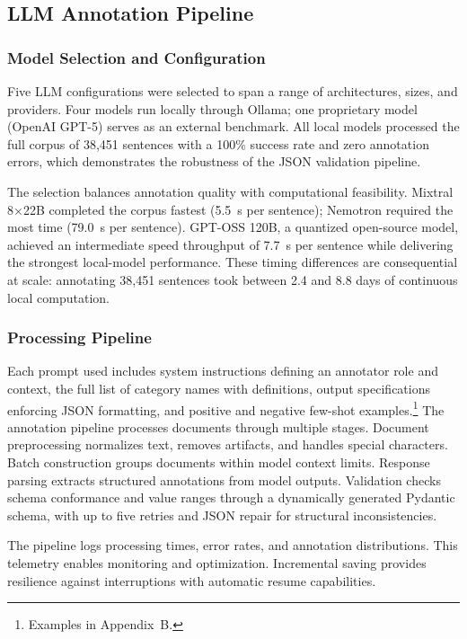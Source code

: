\documentclass[12pt]{article}
\begin{document}
\subsection{LLM Annotation Pipeline}

\subsubsection{Model Selection and Configuration}

Five LLM configurations were selected to span a range of architectures, sizes, and providers. Four models run locally through Ollama; one proprietary model (OpenAI GPT-5) serves as an external benchmark. All local models processed the full corpus of 38,451 sentences with a 100\% success rate and zero annotation errors, which demonstrates the robustness of the JSON validation pipeline.



The selection balances annotation quality with computational feasibility. Mixtral 8$\times$22B completed the corpus fastest (5.5~s per sentence); Nemotron required the most time (79.0~s per sentence). GPT-OSS 120B, a quantized open-source model, achieved an intermediate speed throughput of 7.7~s per sentence while delivering the strongest local-model performance. These timing differences are consequential at scale: annotating 38,451 sentences took between 2.4 and 8.8 days of continuous local computation.

\subsubsection{Processing Pipeline}

Each prompt used includes system instructions defining an annotator role and context, the full list of category names with definitions, output specifications enforcing JSON formatting, and positive and negative few-shot examples.\footnote{Examples in Appendix~B.} The annotation pipeline processes documents through multiple stages. Document preprocessing normalizes text, removes artifacts, and handles special characters. Batch construction groups documents within model context limits. Response parsing extracts structured annotations from model outputs. Validation checks schema conformance and value ranges through a dynamically generated Pydantic schema, with up to five retries and JSON repair for structural inconsistencies.

The pipeline logs processing times, error rates, and annotation distributions. This telemetry enables monitoring and optimization. Incremental saving provides resilience against interruptions with automatic resume capabilities.
\end{document}
